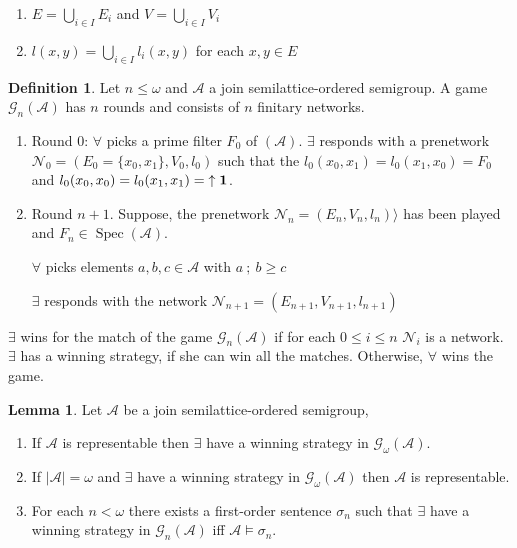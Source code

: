 \documentclass[a4paper]{article}
\theoremstyle{definition}
\newtheorem{definition}{Definition}
\theoremstyle{theorem}
\theoremstyle{proposition}
\theoremstyle{lemma}
\newtheorem{lemma}{Lemma}
\theoremstyle{ex}
\theoremstyle{corollary}
\theoremstyle{claim}
\begin{document}
\begin{enumerate}
  \item $E = \bigcup \limits_{i \in I} E_i$ and $V = \bigcup \limits_{i \in I} V_i$
  \item $l(x, y) = \bigcup \limits_{ i \in I } l_i(x, y)$ for each $x, y \in E$
\end{enumerate}

\begin{definition}
  Let $n \leq \omega$ and $\mathcal{A}$ a join semilattice-ordered semigroup. A game $\mathcal{G}_n(\mathcal{A})$ has $n$ rounds and consists of $n$ finitary networks.

  \begin{enumerate}
    \item Round $0$: $\forall$ picks a prime filter $F_0$ of $(\mathcal{A})$. $\exists$ responds with a prenetwork $\mathcal{N}_0 = (E_0 = \{ x_0, x_1 \}, V_0, l_0)$ such that the $l_0(x_0, x_1) = l_0(x_1, x_0) = F_0$ and $l_0(x_0, x_0) = l_0(x_1, x_1) = {\uparrow {\bf 1}}$.
    \item Round $n + 1$. Suppose, the prenetwork $\mathcal{N}_n = (E_n, V_n, l_n) \rangle$ has been played and $F_n \in \operatorname{Spec}(\mathcal{A})$.

    $\forall$ picks elements $a, b, c \in \mathcal{A}$ with $a \: ; \: b \geq c$

    $\exists$ responds with the network $\mathcal{N}_{n + 1} = (E_{n + 1}, V_{n + 1}, l_{n + 1})$
  \end{enumerate}

  $\exists$ wins for the match of the game $\mathcal{G}_n(\mathcal{A})$ if for each $0 \leq i \leq n$ $\mathcal{N}_i$ is a network. $\exists$ has a winning strategy, if she can win all the matches. Otherwise, $\forall$ wins the game.
\end{definition}

\begin{lemma} Let $\mathcal{A}$ be a join semilattice-ordered semigroup,

  \begin{enumerate}
    \item If $\mathcal{A}$ is representable then $\exists$ have a winning strategy in $\mathcal{G}_{\omega}(\mathcal{A})$.
    \item If $|\mathcal{A}| = \omega$ and $\exists$ have a winning strategy in $\mathcal{G}_{\omega}(\mathcal{A})$ then $\mathcal{A}$ is representable.
    \item For each $n < \omega$ there exists a first-order sentence $\sigma_n$ such that $\exists$ have a winning strategy in $\mathcal{G}_n(\mathcal{A})$ iff $\mathcal{A} \models \sigma_n$.
  \end{enumerate}
\end{lemma}
\end{document}
